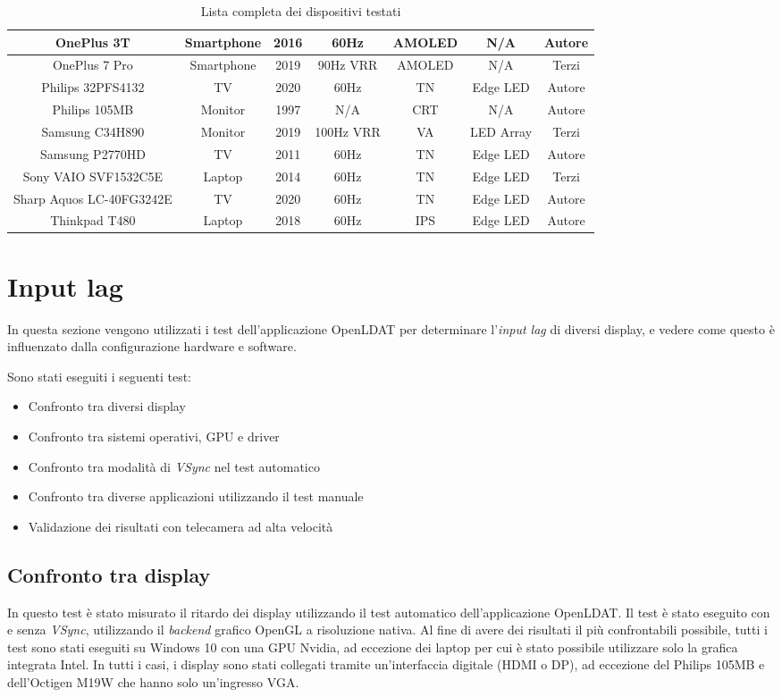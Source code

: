 \begin{landscape}
\begin{table}[h!]
{\begin{tabular}{|c|c|c|c|c|c|c|}
			OnePlus 3T & Smartphone & 2016 & 60Hz & AMOLED & N/A & Autore \\ \hline
			OnePlus 7 Pro & Smartphone & 2019 & 90Hz VRR & AMOLED & N/A & Terzi \\ \hline
			Philips 32PFS4132 & TV & 2020 & 60Hz & TN & Edge LED & Autore \\ \hline
			Philips 105MB & Monitor & 1997 & N/A & CRT & N/A & Autore \\ \hline
			Samsung C34H890 & Monitor & 2019 & 100Hz VRR & VA & LED Array & Terzi \\ \hline
			Samsung P2770HD & TV & 2011 & 60Hz & TN & Edge LED & Autore \\ \hline
			Sony VAIO SVF1532C5E & Laptop & 2014 & 60Hz & TN & Edge LED & Terzi \\ \hline
			Sharp Aquos LC-40FG3242E & TV & 2020 & 60Hz & TN & Edge LED & Autore \\ \hline
			Thinkpad T480 & Laptop & 2018 & 60Hz & IPS & Edge LED & Autore \\ \hline
		\end{tabular}
	}
	\caption{\label{tab:display_list}Lista completa dei dispositivi testati}
\end{table}
\end{landscape}

\section{Input lag}
In questa sezione vengono utilizzati i test dell'applicazione OpenLDAT per determinare l'\textit{input lag} di diversi display, e vedere come questo è influenzato dalla configurazione hardware e software.

Sono stati eseguiti i seguenti test:\begin{itemize}
	\item Confronto tra diversi display
	\item Confronto tra sistemi operativi, GPU e driver
	\item Confronto tra modalità di \textit{VSync} nel test automatico
	\item Confronto tra diverse applicazioni utilizzando il test manuale
	\item Validazione dei risultati con telecamera ad alta velocità
\end{itemize}

\subsection{Confronto tra display}
In questo test è stato misurato il ritardo dei display utilizzando il test automatico dell'applicazione OpenLDAT. Il test è stato eseguito con e senza \textit{VSync}, utilizzando il \textit{backend} grafico OpenGL a risoluzione nativa. Al fine di avere dei risultati il più confrontabili possibile, tutti i test sono stati eseguiti su Windows 10 con una GPU Nvidia, ad eccezione dei laptop per cui è stato possibile utilizzare solo la grafica integrata Intel. In tutti i casi, i display sono stati collegati tramite un'interfaccia digitale (HDMI o DP), ad eccezione del Philips 105MB e dell'Octigen M19W che hanno solo un'ingresso VGA.

